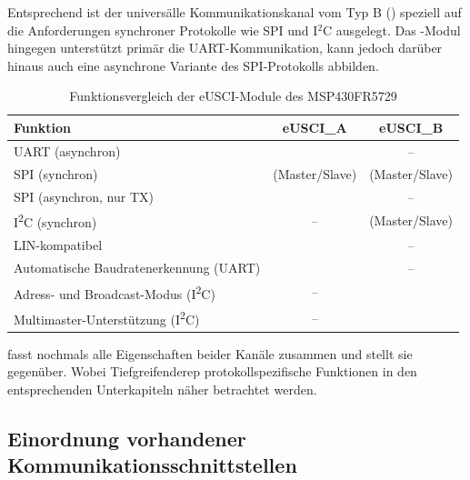 \newpage
Entsprechend ist der univers\"alle Kommunikationskanal vom Typ B () speziell auf die Anforderungen synchroner Protokolle wie SPI und I$^{2}$C ausgelegt. Das -Modul hingegen unterst\"utzt prim\"ar die UART-Kommunikation, kann jedoch dar\"uber hinaus auch eine asynchrone Variante des SPI-Protokolls abbilden. 

\begin{table}[h!]
	\small
	\centering
	\begin{tabular}{|l|c|c|}
		\hline
		\textbf{Funktion} & \textbf{eUSCI\_A} & \textbf{eUSCI\_B} \\\hline
		UART (asynchron) & \checkmark & -- \\\hline
		SPI (synchron) & \checkmark (Master/Slave) & \checkmark (Master/Slave) \\\hline
		SPI (asynchron, nur TX) & \checkmark & -- \\\hline
		I\textsuperscript{2}C (synchron) & -- & \checkmark (Master/Slave) \\\hline
		LIN-kompatibel & \checkmark & -- \\\hline
		Automatische Baudratenerkennung (UART) & \checkmark & -- \\\hline
		Adress- und Broadcast-Modus (I\textsuperscript{2}C) & -- & \checkmark \\\hline
		Multimaster-Unterst\"utzung (I\textsuperscript{2}C) & -- & \checkmark \\\hline
	\end{tabular}
	\caption{Funktionsvergleich der eUSCI-Module des MSP430FR5729\\}
	\label{tab:eusci-vergleich}
\end{table}

 fasst nochmals alle Eigenschaften beider Kan\"ale zusammen und stellt sie gegen\"uber. Wobei Tiefgreifenderep protokollspezifische Funktionen in den entsprechenden Unterkapiteln n\"aher betrachtet werden.

\subsection{Einordnung vorhandener Kommunikationsschnittstellen}
\label{sec:Einordnung_Schnittstellen}

